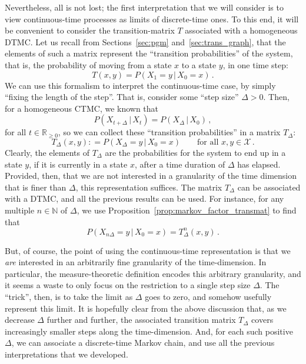 \documentclass[graybox]{svmult}
\newcommand{\nats}{\mathbb{N}}
\newcommand{\reals}{\mathbb{R}}
\newcommand{\realsnonneg}{\reals_{\geq 0}}
\newcommand{\states}{\mathcal{X}}
\newcommand{\coloneqq}{:\!=}
\begin{document}
Nevertheless, all is not lost; the first interpretation that we will consider is to view continuous-time processes as limits of discrete-time ones. To this end, it will be convenient to consider the transition-matrix $T$ associated with a homogeneous DTMC. Let us recall from Sections~\ref{sec:pgm} and~\ref{sec:trans_graph}, that the elements of such a matrix represent the ``transition probabilities'' of the system, that is, the probability of moving from a state $x$ to a state $y$, in one time step:
\begin{equation*}
T(x,y) = P(X_1=y\,\vert\,X_0=x)\,.
\end{equation*}
We can use this formalism to interpret the continuous-time case, by simply ``fixing the length of the step''. That is, consider some ``step size'' $\Delta>0$. Then, for a homogeneous CTMC, we known that
\begin{equation*}
P(X_{t+\Delta}\,\vert\,X_t) = P(X_\Delta\,\vert\,X_0)\,,
\end{equation*}
for all $t\in\realsnonneg$, so we can collect these ``transition probabilities'' in a matrix $T_\Delta$:
\begin{equation*}
T_\Delta(x,y) \coloneqq P(X_\Delta=y\,\vert\,X_0=x)\quad\quad\text{for all }x,y\in\states\,.
\end{equation*}
Clearly, the elements of $T_\Delta$ are the probabilities for the system to end up in a state $y$, if it is currently in a state $x$, after a time duration of $\Delta$ has elapsed. Provided, then, that we are not interested in a granularity of the time dimension that is finer than $\Delta$, this representation suffices. The matrix $T_\Delta$ can be associated with a DTMC, and all the previous results can be used. For instance, for any multiple $n\in\nats$ of $\Delta$, we use Proposition~\ref{prop:markov_factor_transmat} to find that
\begin{equation*}
P(X_{n\Delta}=y\,\vert\,X_0=x) = T_\Delta^n(x,y)\,.
\end{equation*}

But, of course, the point of using the continuous-time representation is that we \emph{are} interested in an arbitrarily fine granularity of the time-dimension. In particular, the measure-theoretic definition encodes this arbitrary granularity, and it seems a waste to only focus on the restriction to a single step size $\Delta$. The ``trick'', then, is to take the limit as $\Delta$ goes to zero, and somehow usefully represent this limit. It is hopefully clear from the above discussion that, as we decrease $\Delta$ further and further, the associated transition matrix $T_\Delta$ covers increasingly smaller steps along the time-dimension. And, for each such positive $\Delta$, we can associate a discrete-time Markov chain, and use all the previous interpretations that we developed.
\end{document}
